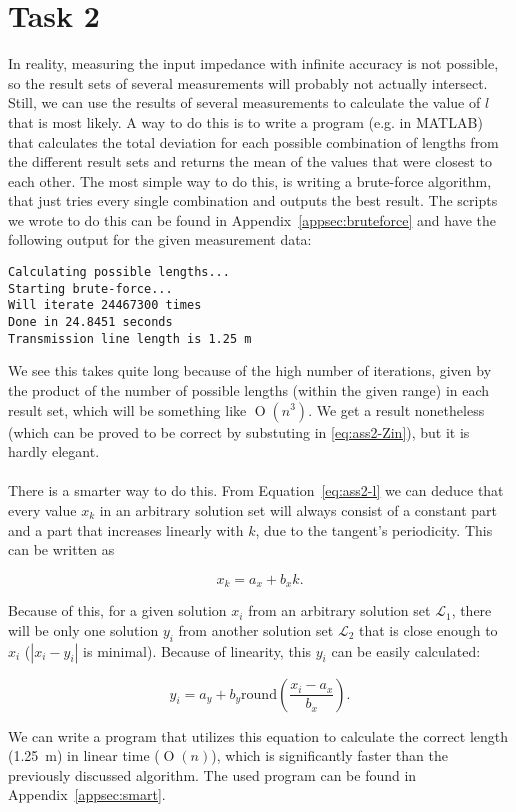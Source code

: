 \documentclass[11pt,titlepage]{report}
\begin{document}
\section{Task 2}
In reality, measuring the input impedance with infinite accuracy is not possible, so the result sets of several measurements will probably not actually intersect.
\\
Still, we can use the results of several measurements to calculate the value of $l$ that is most likely. A way to do this is to write a program (e.g. in MATLAB) that calculates the total deviation for each possible combination of lengths from the different result sets and returns the mean of the values that were closest to each other. The most simple way to do this, is writing a brute-force algorithm, that just tries every single combination and outputs the best result. The scripts we wrote to do this can be found in Appendix~\ref{appsec:bruteforce} and have the following output for the given measurement data:

\begin{verbatim}
Calculating possible lengths...
Starting brute-force...
Will iterate 24467300 times
Done in 24.8451 seconds
Transmission line length is 1.25 m
\end{verbatim}

We see this takes quite long because of the high number of iterations, given by the product of the number of possible lengths (within the given range) in each result set, which will be something like $\operatorname{O}(n^3)$. We get a result nonetheless (which can be proved to be correct by substuting in \ref{eq:ass2-Zin}), but it is hardly elegant.
\\
\\
There is a smarter way to do this. From Equation~\ref{eq:ass2-l} we can deduce that every value $x_k$ in an arbitrary solution set will always consist of a constant part and a part that increases linearly with $k$, due to the tangent's periodicity. This can be written as

\begin{equation}
	x_k = a_x + b_x k.
\end{equation}

Because of this, for a given solution $x_i$ from an arbitrary solution set $\mathcal{L_1}$, there will be only one solution $y_i$ from another solution set $\mathcal{L_2}$ that is close enough to $x_i$ ($|x_i-y_i|$ is minimal). Because of linearity, this $y_i$ can be easily calculated:

\begin{equation}
	y_i = a_y + b_y \mathrm{round}\left(\frac{x_i-a_x}{b_x}\right).
\end{equation}

We can write a program that utilizes this equation to calculate the correct length (\SI{1.25}{m}) in linear time ($\operatorname{O}(n)$), which is significantly faster than the previously discussed algorithm. The used program can be found in Appendix~\ref{appsec:smart}.
	
\end{document}
